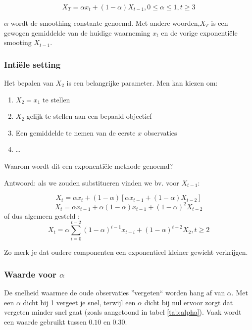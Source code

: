 \begin{definition}
\begin{equation}
	X_{T} = \alpha x_{t} + (1-\alpha)X_{t-1}, 0 \leq \alpha \leq 1, t \geq 3
\label{eq:singleExpSmooting}
\end{equation}
\end{definition}

$\alpha$ wordt de smoothing constante genoemd. Met andere woorden,$X_{T}$ is een gewogen gemiddelde van de huidige waarneming $x_t$ en de vorige exponenti\"ele smooting $X_{t-1}$.


\subsubsection{Inti\"ele setting}
Het bepalen van $X_{2}$ is een belangrijke parameter. Men kan kiezen om:
\begin{enumerate}
	\item $X_{2} = x_{1}$ te stellen
	\item $X_{2}$ gelijk te stellen aan een bepaald objectief
	\item Een gemiddelde te nemen van de eerste $x$ observaties
	\item \dots
\end{enumerate}

\begin{exercise}
	Waarom wordt dit een exponenti\"ele methode genoemd?
\end{exercise}
Antwoord: als we zouden substitueren vinden we bv. voor $X_{t-1}$:

\[ X_{t} = \alpha x_{t} + (1-\alpha)\left[\alpha x_{t-1} + (1-\alpha)X_{t-2}\right] \] 
\[ X_{t} = \alpha x_{t-1} + \alpha (1-\alpha)x_{t-1} + (1-\alpha)^{2} X_{t-2} \]
of dus algemeen gesteld :
\[ X_{t} = \alpha \sum_{i=0}^{t-2}(1-\alpha)^{i-1}x_{t-i} + (1-\alpha)^{t-2} X_{2}, t \geq 2 \]

Zo merk je dat oudere componenten een exponentieel kleiner gewicht verkrijgen. 

\subsubsection{Waarde voor $\alpha$}
De snelheid waarmee de oude observaties ''vergeten`` worden hang af van $\alpha$. Met een $\alpha$ dicht bij 1 vergeet je snel, terwijl een $\alpha$ dicht bij nul ervoor zorgt dat vergeten minder snel gaat (zoals aangetoond in tabel \ref{tab:alpha}). Vaak wordt een waarde gebruikt tussen $0.10$ en $0.30$.

